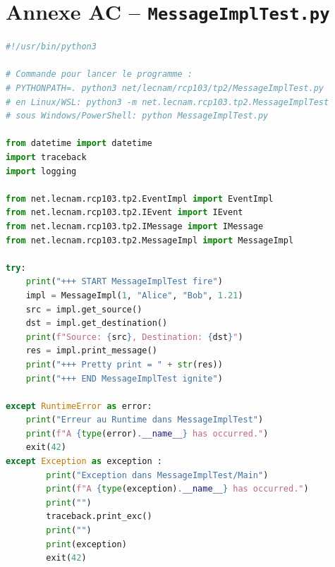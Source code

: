 \documentclass{article}
\begin{document}
\section{Annexe AC -- \texttt{MessageImplTest.py}}
\begin{lstlisting}[language=Python, caption=MessageImplTest.py]
#!/usr/bin/python3

# Commande pour lancer le programme : 
# PYTHONPATH=. python3 net/lecnam/rcp103/tp2/MessageImplTest.py
# en Linux/WSL: python3 -m net.lecnam.rcp103.tp2.MessageImplTest
# sous Windows/PowerShell: python MessageImplTest.py

from datetime import datetime
import traceback
import logging

from net.lecnam.rcp103.tp2.EventImpl import EventImpl
from net.lecnam.rcp103.tp2.IEvent import IEvent
from net.lecnam.rcp103.tp2.IMessage import IMessage
from net.lecnam.rcp103.tp2.MessageImpl import MessageImpl

try:
    print("+++ START MessageImplTest fire")
    impl = MessageImpl(1, "Alice", "Bob", 1.21)
    src = impl.get_source()
    dst = impl.get_destination()
    print(f"Source: {src}, Destination: {dst}")
    res = impl.print_message()
    print("+++ Pretty print = " + str(res))   
    print("+++ END MessageImplTest ignite")

except RuntimeError as error:
    print("Erreur au Runtime dans MessageImplTest")
    print(f"A {type(error).__name__} has occurred.")
    exit(42)
except Exception as exception :
        print("Exception dans MessageImplTest/Main")
        print(f"A {type(exception).__name__} has occurred.")
        print("")
        traceback.print_exc()
        print("")
        print(exception)
        exit(42)

\end{lstlisting}
\end{document}

